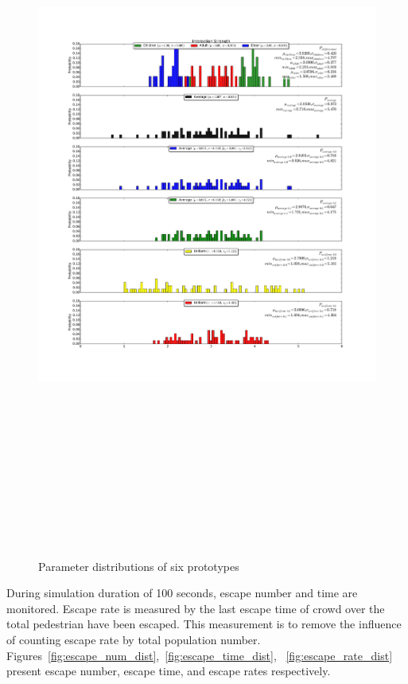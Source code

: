 \documentclass[a4paper,11pt,phdthesis,singlespace,twoside]{cssethesis}
\begin{document}
\begin{itemize}
\begin{figure}[H]
\includegraphics[width=22cm,height=24cm]{figs/interaction_strength_dist.pdf}
\caption{Parameter distributions of six prototypes}
\label{fig:interaction_strength_dist}
\end{figure}
During simulation duration of 100 seconds, escape number and time are monitored. Escape rate is measured by the last escape time of crowd over the total pedestrian have been escaped. This measurement is to remove the influence of counting escape rate by total population number. Figures~\ref{fig:escape_num_dist},~\ref{fig:escape_time_dist}, ~\ref{fig:escape_rate_dist} present escape number, escape time, and escape rates respectively.

\end{itemize}
\end{document}
